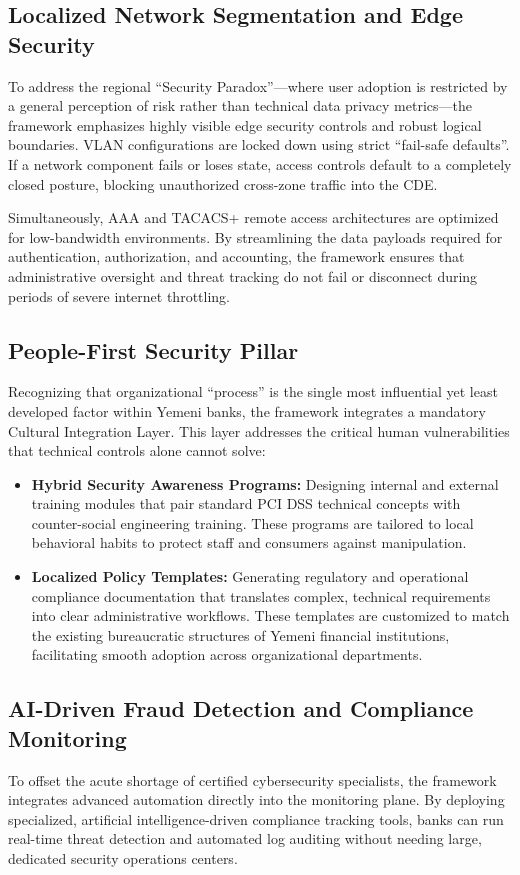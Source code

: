 \documentclass[12pt,a4paper,oneside]{report}
\begin{document}
	\subsection{Localized Network Segmentation and Edge Security}
	To address the regional ``Security Paradox''—where user adoption is restricted by a general perception of risk rather than technical data privacy metrics—the framework emphasizes highly visible edge security controls and robust logical boundaries. VLAN configurations are locked down using strict ``fail-safe defaults''. If a network component fails or loses state, access controls default to a completely closed posture, blocking unauthorized cross-zone traffic into the CDE. 
	
	Simultaneously, AAA and TACACS+ remote access architectures are optimized for low-bandwidth environments. By streamlining the data payloads required for authentication, authorization, and accounting, the framework ensures that administrative oversight and threat tracking do not fail or disconnect during periods of severe internet throttling.
	
	\subsection{People-First Security Pillar}
	Recognizing that organizational ``process'' is the single most influential yet least developed factor within Yemeni banks, the framework integrates a mandatory Cultural Integration Layer. This layer addresses the critical human vulnerabilities that technical controls alone cannot solve:
	\begin{itemize}
		\item \textbf{Hybrid Security Awareness Programs:} Designing internal and external training modules that pair standard PCI DSS technical concepts with counter-social engineering training. These programs are tailored to local behavioral habits to protect staff and consumers against manipulation.
		\item \textbf{Localized Policy Templates:} Generating regulatory and operational compliance documentation that translates complex, technical requirements into clear administrative workflows. These templates are customized to match the existing bureaucratic structures of Yemeni financial institutions, facilitating smooth adoption across organizational departments.
	\end{itemize}
	
	\subsection{AI-Driven Fraud Detection and Compliance Monitoring}
	To offset the acute shortage of certified cybersecurity specialists, the framework integrates advanced automation directly into the monitoring plane. By deploying specialized, artificial intelligence-driven compliance tracking tools, banks can run real-time threat detection and automated log auditing without needing large, dedicated security operations centers. 
	
\end{document}
